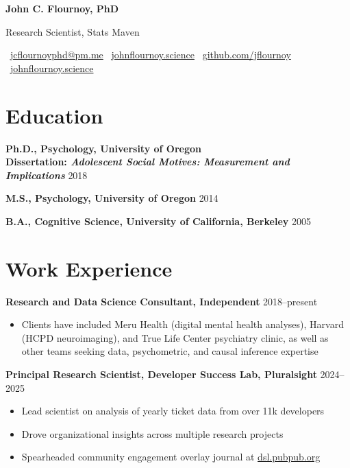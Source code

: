 \documentclass[
  10pt,
  letterpaper,
  DIV=11,
  numbers=noendperiod]{scrartcl}
\author{}
\date{}
\providecommand{\tightlist}{%
  \setlength{\itemsep}{0pt}\setlength{\parskip}{0pt}}\usepackage{longtable,booktabs,array}
\newcommand{\entry}[2]{%
  \noindent \textbf{#1} \hfill {\small #2}
}
\begin{document}
\begin{center}
{\LARGE\sffamily\textbf{John C. Flournoy, PhD}\par}
\vspace{0.2em}
{\large\sffamily Research Scientist, Stats Maven\par}
\vspace{0.3em}

\sffamily\small
\faEnvelope\ \href{mailto:jcflournoyphd@pm.me}{jcflournoyphd@pm.me} \quad
\faGlobe\ \href{https://johnflournoy.science}{johnflournoy.science} \quad
\faGithub\ \href{https://github.com/jflournoy}{github.com/jflournoy} \quad
\faAt\ \href{https://bsky.app/profile/johnflournoy.science}{johnflournoy.science}
\end{center}
\vspace{0.5em}


\section{Education}\label{education}

\entry{Ph.D., Psychology, University of Oregon \\ \textmd{Dissertation: \textit{Adolescent Social Motives: Measurement and Implications}}}{2018}

\entry{M.S., Psychology, University of Oregon}{2014}

\entry{B.A., Cognitive Science, University of California, Berkeley}{2005}

\section{Work Experience}\label{work-experience}

\entry{Research and Data Science Consultant, Independent}{2018--present}

\begin{itemize}
\tightlist
\item
  Clients have included Meru Health (digital mental health analyses),
  Harvard (HCPD neuroimaging), and True Life Center psychiatry clinic,
  as well as other teams seeking data, psychometric, and causal
  inference expertise
\end{itemize}

\entry{Principal Research Scientist, Developer Success Lab, Pluralsight}{2024--2025}

\begin{itemize}
\tightlist
\item
  Lead scientist on analysis of yearly ticket data from over 11k
  developers
\item
  Drove organizational insights across multiple research projects
\item
  Spearheaded community engagement overlay journal at
  \href{http://dsl.pubpub.org}{dsl.pubpub.org}
\end{itemize}
\end{document}
